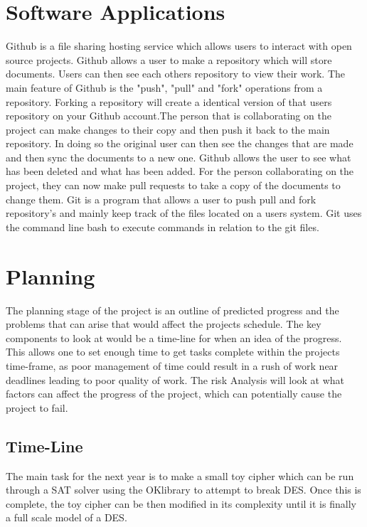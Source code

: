 \documentclass[11pt,a4paper]{article}
\begin{document}
\section{Software Applications}
Github is a file sharing hosting service which allows users to interact with open source projects. Github allows a user to make a repository which will store documents. Users can then see each others repository to view their work. The main feature of Github is the "push", "pull" and "fork" operations from a repository. Forking a repository will create a identical version of that users repository on your Github account.The person that is collaborating on the project can make changes to their copy and then push it back to the main repository. In doing so the original user can then see the changes that are made and then sync the documents to a new one. Github allows the user to see what has been deleted and what has been added. For the person collaborating on the project, they can now make pull requests to take a copy of the documents to change them. 
Git is a program that allows a user to push pull and fork repository's and mainly keep track of the files located on a users system. Git uses the command line bash to execute commands in relation to the git files.  

\section{Planning}
The planning stage of the project is an outline of predicted progress and the problems that can arise that would affect the projects schedule. The key components to look at would be a time-line for when an idea of the progress. This allows one to set enough time to get tasks complete within the projects time-frame, as poor management of time could result in a rush of work near deadlines leading to poor quality of work.
The risk Analysis will look at what factors can affect the progress of the project, which can potentially cause the project to fail.

\subsection{Time-Line}
The main task for the next year is to make a small toy cipher which can be run through a SAT solver using the OKlibrary to attempt to break DES. Once this is complete, the toy cipher can be then modified in its complexity until it is finally a full scale model of a DES. \\
\end{document}
